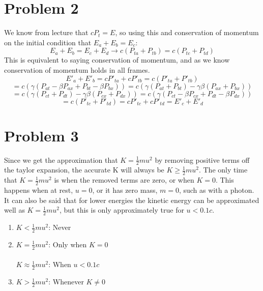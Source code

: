 \documentclass[11pt]{article}
\begin{document}
\section*{Problem 2}
    We know from lecture that $cP_t = E$, so using this and conservation of momentum on the initial condition that $E_a+E_b=E_c$:
    \[E_a + E_b = E_c + E_d \rightarrow c(P_{ta} +P_{tb}) = c(P_{tc} +P_{td})\]
    This is equivalent to saying conservation of momentum, and as we know conservation of momentum holds in all frames. 
    \[E'_a + E'_b = cP'_{ta} + cP'_{tb}=c(P'_{ta} + P'_{tb})\]
    \[=c(\gamma(P_{at} - \beta P_{ax} + P_{bt} - \beta P_{bx})) = c(\gamma(P_{at}+ P_{bt})-\gamma \beta (P_{ax} + P_{bx}))\]
    \[= c(\gamma(P_{ct}+ P_{dt})-\gamma \beta (P_{cx} + P_{dx})) = c(\gamma(P_{ct} - \beta P_{cx} + P_{dt} - \beta P_{dx}))\]
    \[= c(P'_{tc} + P'_{td}) = cP'_{tc} + cP'_{td} = E'_c + E'_d\]
    
\section*{Problem 3}
    Since we get the approximation that $K=\frac{1}{2}mu^2$ by removing positive terms off the taylor expansion, the accurate K will always be $K\geq \frac{1}{2}mu^2$. The only time that $K=\frac{1}{2}mu^2$ is when the removed terms are zero, or when $K=0$. This happens when at rest, $u=0$, or it has zero mass, $m=0$, such as with a photon. It can also be said that for lower energies the kinetic energy can be approximated well as $K=\frac{1}{2}mu^2$, but this is only approximately true for $u<0.1c$.
    \begin{enumerate}[label=\alph*)]
        \item $K<\frac{1}{2}mu^2$: Never
        \item $K = \frac{1}{2}mu^2$: Only when $K=0$\\\\
                $K \approx \frac{1}{2}mu^2$: When $u<0.1c$
        \item $K>\frac{1}{2}mu^2$: Whenever $K \neq 0$
    \end{enumerate}
\end{document}
